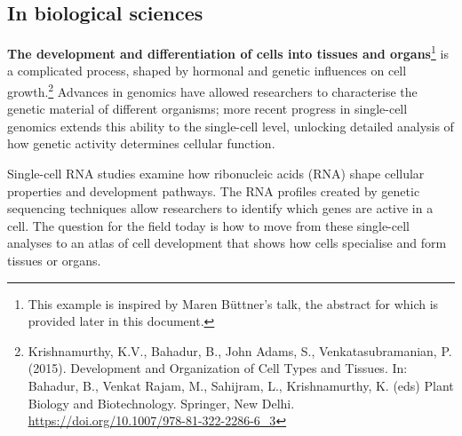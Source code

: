 {\hypertarget{section}{%
\subsection{}\label{section}}

\hypertarget{in-biological-sciences}{%
\subsection{\texorpdfstring{In biological sciences
}{In biological sciences }}\label{in-biological-sciences}}

\textbf{The development and differentiation of cells into tissues and
organs}\footnote{This example is inspired by Maren Büttner's talk, the
  abstract for which is provided later in this document.} is a
complicated process, shaped by hormonal and genetic influences on cell
growth.\footnote{Krishnamurthy, K.V., Bahadur, B., John Adams, S.,
  Venkatasubramanian, P. (2015). Development and Organization of Cell
  Types and Tissues. In: Bahadur, B., Venkat Rajam, M., Sahijram, L.,
  Krishnamurthy, K. (eds) Plant Biology and Biotechnology. Springer, New
  Delhi.
  \href{https://doi.org/10.1007/978-81-322-2286-6_3}{\uline{https://doi.org/10.1007/978-81-322-2286-6\_3}}}
Advances in genomics have allowed researchers to characterise the
genetic material of different organisms; more recent progress in
single-cell genomics extends this ability to the single-cell level,
unlocking detailed analysis of how genetic activity determines cellular
function.

Single-cell RNA studies examine how ribonucleic acids (RNA) shape
cellular properties and development pathways. The RNA profiles created
by genetic sequencing techniques allow researchers to identify which
genes are active in a cell. The question for the field today is how to
move from these single-cell analyses to an atlas of cell development
that shows how cells specialise and form tissues or organs.

}

